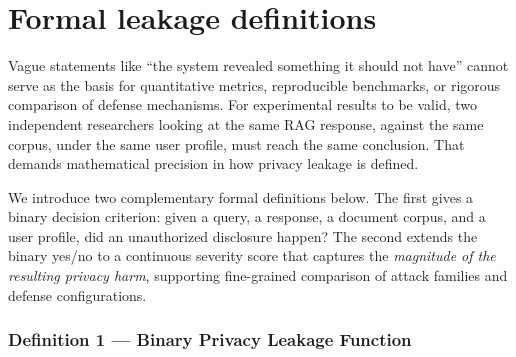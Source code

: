 \section{Formal leakage definitions}
\label{sec:ch3-formal}

\label{ch3:sec:definitions}

Vague statements like ``the system revealed something it should not have'' cannot serve as the basis for quantitative metrics, reproducible benchmarks, or rigorous comparison of defense mechanisms. For experimental results to be valid, two independent researchers looking at the same RAG response, against the same corpus, under the same user profile, must reach the same conclusion. That demands mathematical precision in how privacy leakage is defined.

We introduce two complementary formal definitions below. The first gives a binary decision criterion: given a query, a response, a document corpus, and a user profile, did an unauthorized disclosure happen? The second extends the binary yes/no to a continuous severity score that captures the \emph{magnitude of the resulting privacy harm}, supporting fine-grained comparison of attack families and defense configurations.


\subsubsection{Definition 1 --- Binary Privacy Leakage Function}
\label{ch3:subsec:def1}

